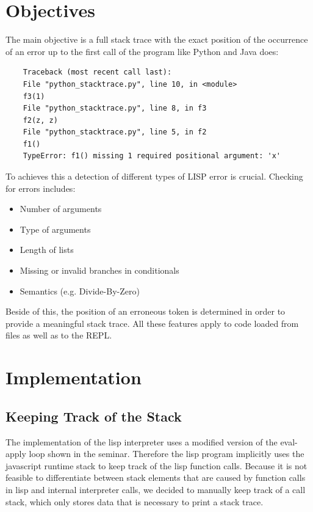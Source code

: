 \documentclass[a4paper,titlepage]{article}
\numberwithin{equation}{section} %
\begin{document}
	
	
	\section{Objectives}
	The main objective is a full stack trace with the exact position of the occurrence of an error up to the first call of the program like Python and Java does:
	
	\begin{lstlisting}
	Traceback (most recent call last):
	File "python_stacktrace.py", line 10, in <module>
	f3(1)
	File "python_stacktrace.py", line 8, in f3
	f2(z, z)
	File "python_stacktrace.py", line 5, in f2
	f1()
	TypeError: f1() missing 1 required positional argument: 'x'
	\end{lstlisting}
	
	To achieves this a detection of different types of LISP error is crucial. Checking for errors includes:
	\begin{itemize}
		\item Number of arguments
		\item Type of arguments
		\item Length of lists
		\item Missing or invalid branches in conditionals
		\item Semantics (e.g. Divide-By-Zero)
	\end{itemize}
	
	Beside of this, the position of an erroneous token is determined in order to provide a meaningful stack trace. All these features apply to code loaded from files as well as to the REPL.
	\newpage
	
	
	\section{Implementation}
	\subsection{Keeping Track of the Stack}
	
	The implementation of the lisp interpreter uses a modified version of the eval-apply loop shown in the seminar. Therefore the lisp program implicitly uses the javascript runtime stack to keep track of the lisp function calls. Because it is not feasible to differentiate between stack elements that are caused by function calls in lisp and internal interpreter  calls, we decided to manually keep track of a call stack, which only stores data that is necessary to print a stack trace.
	
\end{document}
